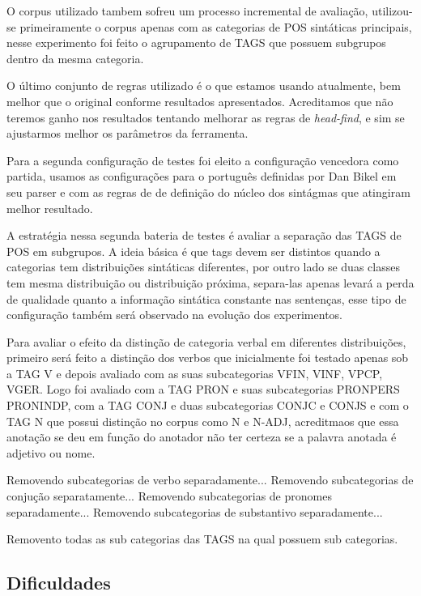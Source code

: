 O corpus utilizado tambem sofreu um processo incremental de avaliação, utilizou-se primeiramente o corpus apenas com as categorias de POS sintáticas principais, nesse experimento foi feito o agrupamento de TAGS que possuem subgrupos dentro da mesma categoria.

O último conjunto de regras utilizado é o que estamos usando atualmente, bem melhor que o original conforme resultados apresentados. Acreditamos que não teremos ganho nos resultados tentando melhorar as regras de \emph{head-find}, e sim se ajustarmos melhor os parâmetros da ferramenta.

Para a segunda configuração de testes foi eleito a configuração vencedora como partida, usamos as configurações para o português definidas por Dan Bikel em seu parser e com as regras de de definição do núcleo dos sintágmas que atingiram melhor resultado.

A estratégia nessa segunda bateria de testes é avaliar a separação das TAGS de POS em subgrupos. A ideia básica é que tags devem ser distintos quando a categorias tem distribuições sintáticas diferentes, por outro lado se duas classes tem mesma distribuição ou distribuição próxima, separa-las apenas levará a perda de qualidade quanto a informação sintática constante nas sentenças, esse tipo de configuração também será observado na evolução dos experimentos.

Para avaliar o efeito da distinção de categoria verbal em diferentes distribuições, primeiro será feito a distinção dos verbos que inicialmente foi testado apenas sob a TAG V e depois avaliado com as suas subcategorias VFIN, VINF, VPCP, VGER. Logo foi avaliado com a TAG PRON e suas subcategorias PRONPERS PRONINDP, com a TAG CONJ e duas subcategorias CONJC e CONJS e com o TAG N que possui distinção no corpus como N e N-ADJ, acreditmaos que essa anotação se deu em função do anotador não ter certeza se a palavra anotada é adjetivo ou nome.


Removendo subcategorias de verbo separadamente...
Removendo subcategorias de conjução separatamente...
Removendo subcategorias de pronomes separadamente...
Removendo subcategorias de substantivo separadamente...

Removento todas as sub categorias das TAGS na qual possuem sub categorias. 

\subsection{Dificuldades}
\label{sec:dificuldades}

